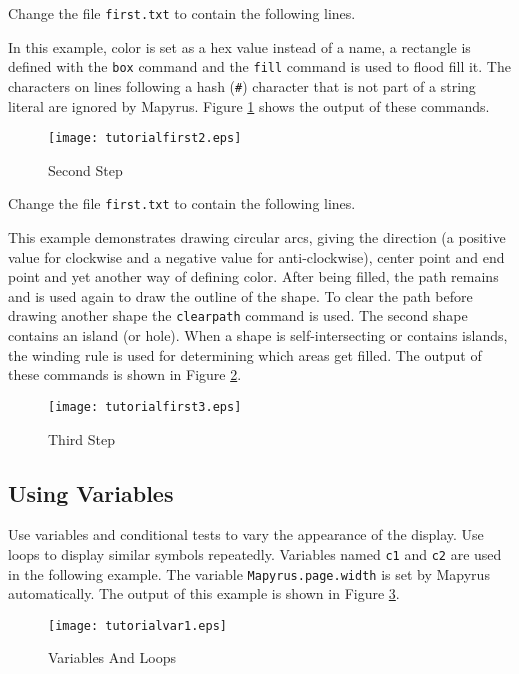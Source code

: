 Change the file \texttt{first.txt} to contain the following lines.



In this example, color is set as a hex value instead of a name,
a rectangle is defined with the \texttt{box} command
and the \texttt{fill} command is used to
flood fill it.
The characters on lines following a hash (\texttt{\#}) character that
is not part of a string literal are ignored by Mapyrus.
Figure \ref{tutorialfirst2} shows the output of these commands.

\begin{figure}[htb]
\texttt{[image: tutorialfirst2.eps]}
\caption{Second Step}
\label{tutorialfirst2}
\end{figure}

Change the file \texttt{first.txt} to contain the following lines.



This example demonstrates drawing circular arcs,
giving the direction (a positive value for clockwise and a negative
value for anti-clockwise), center point and end point and
yet another way of defining color.
After being filled, the path remains and is used again to draw the outline
of the shape.
To clear the path before drawing another shape the
\texttt{clearpath}
command is used.
The second shape contains an island (or hole).  When a shape is
self-intersecting or contains islands, the winding rule is
used for determining which areas get filled.
The output of these commands is shown in Figure \ref{tutorialfirst3}.

\begin{figure}[htb]
\texttt{[image: tutorialfirst3.eps]}
\caption{Third Step}
\label{tutorialfirst3}
\end{figure}

\subsection{Using Variables}

Use variables and conditional tests to vary the appearance
of the display.
Use loops to display similar symbols repeatedly.
Variables named \texttt{c1} and \texttt{c2} are used in the
following example.  The variable
\texttt{Mapyrus.page.width}
is set by Mapyrus automatically.
The output of this example is shown in Figure \ref{tutorialvar1}.



\begin{figure}[htb]
\texttt{[image: tutorialvar1.eps]}
\caption{Variables And Loops}
\label{tutorialvar1}
\end{figure}


